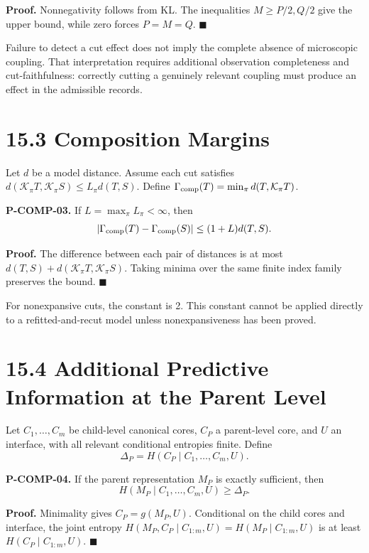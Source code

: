 \documentclass[
  english,
  11pt,
  oneside]{book}
\newcounter{none} %
\begin{document}
\textbf{Proof.} Nonnegativity follows from KL. The inequalities \(M\ge P/2,Q/2\) give the upper bound, while zero forces \(P=M=Q\). \(\blacksquare\)

Failure to detect a cut effect does not imply the complete absence of microscopic coupling. That interpretation requires additional observation completeness and cut-faithfulness: correctly cutting a genuinely relevant coupling must produce an effect in the admissible records.

\section{15.3 Composition Margins}\label{composition-margins}

Let \(d\) be a model distance. Assume each cut satisfies \(d(\mathcal K_\pi T,\mathcal K_\pi S)\le L_\pi d(T,S)\). Define \(\Gamma_{\rm comp}(T)=\min_\pi d(T,\mathcal K_\pi T)\).

\hypertarget{p-comp-03}{}\label{p-comp-03}

\textbf{P-COMP-03.} If \(L=\max_\pi L_\pi<\infty\), then \[|\Gamma_{\rm comp}(T)-\Gamma_{\rm comp}(S)|
\le(1+L)d(T,S).\]

\textbf{Proof.} The difference between each pair of distances is at most \(d(T,S)+d(\mathcal K_\pi T,\mathcal K_\pi S)\). Taking minima over the same finite index family preserves the bound. \(\blacksquare\)

For nonexpansive cuts, the constant is 2. This constant cannot be applied directly to a refitted-and-recut model unless nonexpansiveness has been proved.

\section{15.4 Additional Predictive Information at the Parent Level}\label{additional-predictive-information-at-the-parent-level}

Let \(C_1,\ldots,C_m\) be child-level canonical cores, \(C_P\) a parent-level core, and \(U\) an interface, with all relevant conditional entropies finite. Define \[\Delta_P=H(C_P\mid C_1,\ldots,C_m,U).\]

\hypertarget{p-comp-04}{}\label{p-comp-04}

\textbf{P-COMP-04.} If the parent representation \(M_P\) is exactly sufficient, then \[H(M_P\mid C_1,\ldots,C_m,U)\ge\Delta_P.\]

\textbf{Proof.} Minimality gives \(C_P=g(M_P,U)\). Conditional on the child cores and interface, the joint entropy \(H(M_P,C_P\mid C_{1:m},U)=H(M_P\mid C_{1:m},U)\) is at least \(H(C_P\mid C_{1:m},U)\). \(\blacksquare\)
\end{document}
